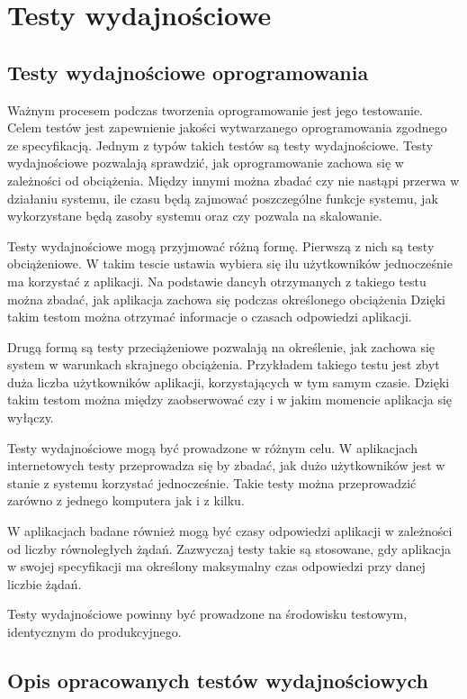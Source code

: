 \chapter{Testy wydajnościowe}
\section{Testy wydajnościowe oprogramowania}
Ważnym procesem podczas tworzenia oprogramowanie jest jego testowanie. Celem testów jest zapewnienie jakości wytwarzanego oprogramowania zgodnego ze specyfikacją. Jednym z typów takich testów są testy wydajnościowe. Testy wydajnościowe pozwalają sprawdzić, jak oprogramowanie zachowa się w zależności od obciążenia. Między innymi można zbadać czy nie nastąpi przerwa w działaniu systemu, ile czasu będą zajmować poszczególne funkcje systemu, jak wykorzystane będą zasoby systemu oraz czy pozwala na skalowanie. 

Testy wydajnościowe mogą przyjmować różną formę. Pierwszą z nich są testy obciążeniowe. W takim tescie ustawia wybiera się ilu użytkowników jednocześnie ma korzystać z aplikacji. Na podstawie dancyh otrzymanych z takiego testu można zbadać, jak aplikacja zachowa się podczas określonego obciążenia Dzięki takim testom można otrzymać informacje o czasach odpowiedzi aplikacji.

Drugą formą są testy przeciążeniowe pozwalają na określenie, jak zachowa się system w warunkach skrajnego obciążenia. Przykładem takiego testu jest zbyt duża liczba użytkowników aplikacji, korzystających w tym samym czasie. Dzięki takim testom można między zaobserwować czy i w jakim momencie aplikacja się wyłączy.

Testy wydajnościowe mogą być prowadzone w różnym celu. W aplikacjach internetowych testy przeprowadza się by zbadać, jak dużo użytkowników jest w stanie z systemu korzystać jednocześnie. Takie testy można przeprowadzić zarówno z jednego komputera jak i z kilku. 

W aplikacjach badane również mogą być czasy odpowiedzi aplikacji w zależności od liczby równoległych żądań. Zazwyczaj testy takie są stosowane, gdy aplikacja w swojej specyfikacji ma określony maksymalny czas odpowiedzi przy danej liczbie żądań.

Testy wydajnościowe powinny być prowadzone na środowisku testowym, identycznym do produkcyjnego.

\section{Opis opracowanych testów wydajnościowych}

